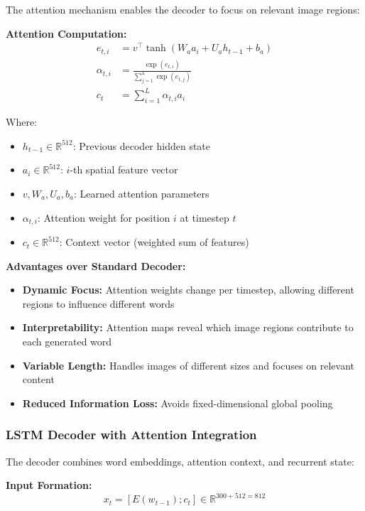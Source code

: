 \documentclass[conference]{IEEEtran}
\begin{document}
The attention mechanism enables the decoder to focus on relevant image regions:

\textbf{Attention Computation:}
\begin{align}
e_{t,i} &= v^\top \tanh(W_a a_i + U_a h_{t-1} + b_a) \\
\alpha_{t,i} &= \frac{\exp(e_{t,i})}{\sum_{j=1}^{L} \exp(e_{t,j})} \\
c_t &= \sum_{i=1}^{L} \alpha_{t,i} a_i
\end{align}

Where:
\begin{itemize}
  \item $h_{t-1} \in \mathbb{R}^{512}$: Previous decoder hidden state
  \item $a_i \in \mathbb{R}^{512}$: $i$-th spatial feature vector
  \item $v, W_a, U_a, b_a$: Learned attention parameters
  \item $\alpha_{t,i}$: Attention weight for position $i$ at timestep $t$
  \item $c_t \in \mathbb{R}^{512}$: Context vector (weighted sum of features)
\end{itemize}

\textbf{Advantages over Standard Decoder:}
\begin{itemize}
  \item \textbf{Dynamic Focus:} Attention weights change per timestep, allowing different regions to influence different words
  \item \textbf{Interpretability:} Attention maps reveal which image regions contribute to each generated word
  \item \textbf{Variable Length:} Handles images of different sizes and focuses on relevant content
  \item \textbf{Reduced Information Loss:} Avoids fixed-dimensional global pooling
\end{itemize}

\subsubsection{LSTM Decoder with Attention Integration}
\label{sec:q1_decoder}

The decoder combines word embeddings, attention context, and recurrent state:

\textbf{Input Formation:}
\begin{equation}
x_t = [E(w_{t-1}); c_t] \in \mathbb{R}^{300 + 512 = 812}
\end{equation}
\end{document}
